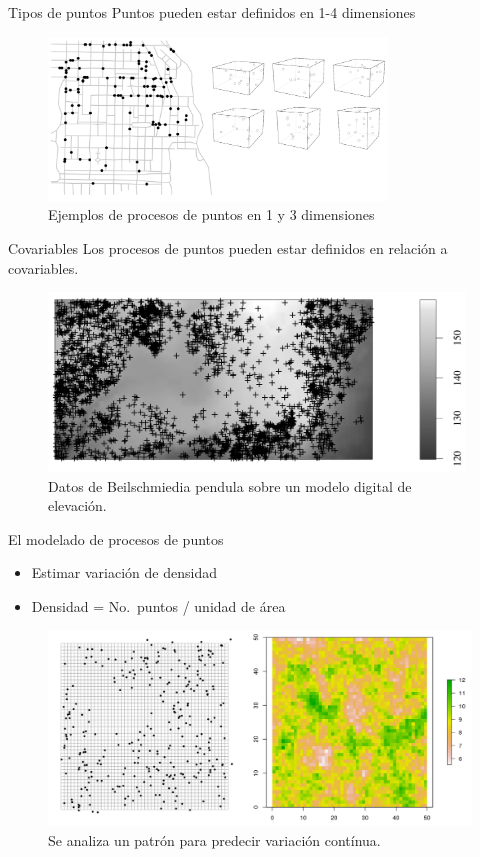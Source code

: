 \documentclass[
  11pt,
  ignorenonframetext,
]{beamer}
\begin{document}
\begin{frame}{Tipos de puntos}
\protect\hypertarget{tipos-de-puntos-2}{}
Puntos pueden estar definidos en 1-4 dimensiones

\begin{figure}
\includegraphics[width=3.54in]{Figuras/1-3D} \caption{Ejemplos de procesos de puntos en 1 y 3 dimensiones}\label{fig:dimensiones}
\end{figure}
\end{frame}

\begin{frame}{Covariables}
\protect\hypertarget{covariables}{}
Los procesos de puntos pueden estar definidos en relación a covariables.

\begin{figure}
\includegraphics[width=4.35in]{Figuras/Covariables} \caption{Datos de Beilschmiedia pendula sobre un modelo digital de elevación.}\label{fig:covar}
\end{figure}
\end{frame}

\begin{frame}{El modelado de procesos de puntos}
\protect\hypertarget{el-modelado-de-procesos-de-puntos}{}
\begin{itemize}
\item
  Estimar variación de densidad
\item
  Densidad = No.~puntos / unidad de área
\end{itemize}

\begin{figure}
\includegraphics[width=4.6in]{Figuras/Conteos-estimacion} \caption{Se analiza un patrón para predecir variación contínua.}\label{fig:cont-estim}
\end{figure}
\end{frame}
\end{document}
